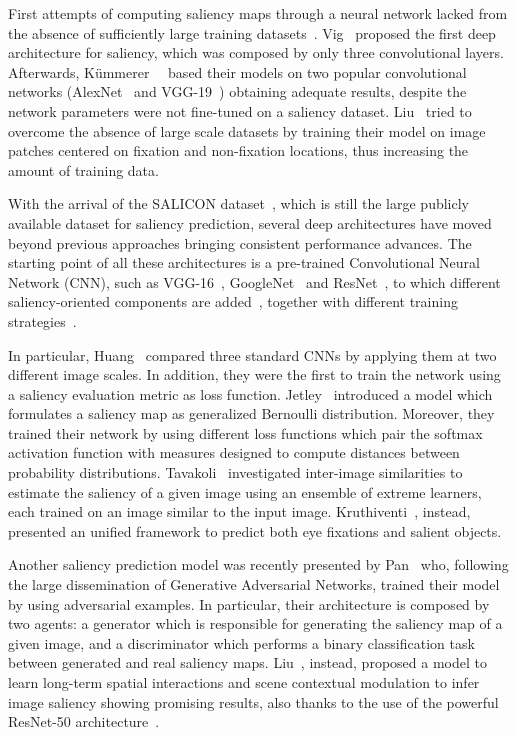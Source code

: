 First attempts of computing saliency maps through a neural network lacked from the absence of sufficiently large training datasets~\cite{vig2014large,kummerer2014deep,liu2015predicting}. Vig~\etal\cite{vig2014large} proposed the first deep architecture for saliency, which was composed by only three convolutional layers. Afterwards, K{\"u}mmerer~\etal~\cite{kummerer2014deep,kummerer2016deepgaze} based their models on two popular convolutional networks (AlexNet~\cite{krizhevsky2012imagenet} and VGG-19~\cite{Simonyan14c}) obtaining adequate results, despite the network parameters were not fine-tuned on a saliency dataset. Liu~\etal\cite{liu2015predicting} tried to overcome the absence of large scale datasets by training their model on image patches centered on fixation and non-fixation locations, thus increasing the amount of training data.      

With the arrival of the SALICON dataset~\cite{jiang2015salicon}, which is still the large publicly available dataset for saliency prediction, several deep architectures have moved beyond previous approaches bringing consistent performance advances. The starting point of all these architectures is a pre-trained Convolutional Neural Network (CNN), such as VGG-16~\cite{Simonyan14c}, GoogleNet~\cite{szegedy2015going} and ResNet~\cite{he2015deep}, to which different saliency-oriented components are added~\cite{mlnet2016,cornia2017sam}, together with different training strategies~\cite{huang2015salicon,jetley2016end,cornia2017sam}. 

In particular, Huang~\etal\cite{huang2015salicon} compared three standard CNNs by applying them at two different image scales. In addition, they were the first to train the network using a saliency evaluation metric as loss function. Jetley~\etal\cite{jetley2016end} introduced a model which formulates a saliency map as generalized Bernoulli distribution. Moreover, they trained their network by using different loss functions which pair the softmax activation function with measures designed to compute distances between probability distributions. Tavakoli~\etal\cite{tavakoli2017exploiting} investigated inter-image similarities to estimate the saliency of a given image using an ensemble of extreme learners, each trained on an image similar to the input image. Kruthiventi~\etal\cite{kruthiventi2016saliency}, instead, presented an unified framework to predict both eye fixations and salient objects. 



Another saliency prediction model was recently presented by Pan~\etal\cite{pan2017salgan} who, following the large dissemination of Generative Adversarial Networks, trained their model by using adversarial examples. In particular, their architecture is composed by two agents: a generator which is responsible for generating the saliency map of a given image, and a discriminator which performs a binary classification task between generated and real saliency maps. Liu~\etal\cite{liu2016deep}, instead, proposed a model to learn long-term spatial interactions and scene contextual modulation to infer image saliency showing promising results, also thanks to the use of the powerful ResNet-50 architecture~\cite{he2015deep}.

